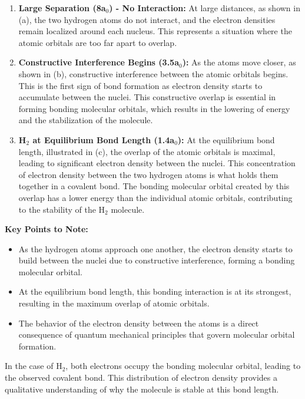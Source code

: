 \documentclass{report}
\begin{document}
\begin{enumerate}
	\item \textbf{Large Separation (8a$_0$) - No Interaction:}
	      At large distances, as shown in (a), the two hydrogen atoms do not interact, and the electron densities remain localized around each nucleus. This represents a situation where the atomic orbitals are too far apart to overlap.

	\item \textbf{Constructive Interference Begins (3.5a$_0$):}
	      As the atoms move closer, as shown in (b), constructive interference between the atomic orbitals begins. This is the first sign of bond formation as electron density starts to accumulate between the nuclei. This constructive overlap is essential in forming bonding molecular orbitals, which results in the lowering of energy and the stabilization of the molecule.

	\item \textbf{H$_2$ at Equilibrium Bond Length (1.4a$_0$):}
	      At the equilibrium bond length, illustrated in (c), the overlap of the atomic orbitals is maximal, leading to significant electron density between the nuclei. This concentration of electron density between the two hydrogen atoms is what holds them together in a covalent bond. The bonding molecular orbital created by this overlap has a lower energy than the individual atomic orbitals, contributing to the stability of the H$_2$ molecule.
\end{enumerate}

\textbf{Key Points to Note:}


\begin{itemize}

	\item As the hydrogen atoms approach one another, the electron density starts to build between the nuclei due to constructive interference, forming a bonding molecular orbital.
	\item At the equilibrium bond length, this bonding interaction is at its strongest, resulting in the maximum overlap of atomic orbitals.
	\item The behavior of the electron density between the atoms is a direct consequence of quantum mechanical principles that govern molecular orbital formation.

\end{itemize}

In the case of H$_2$, both electrons occupy the bonding molecular orbital, leading to the observed covalent bond. This distribution of electron density provides a qualitative understanding of why the molecule is stable at this bond length.
\end{document}
